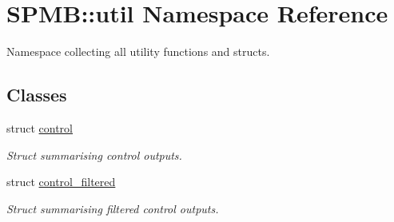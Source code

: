 \hypertarget{namespaceSPMB_1_1util}{}\section{S\+P\+MB\+:\+:util Namespace Reference}
\label{namespaceSPMB_1_1util}


Namespace collecting all utility functions and structs.  


\subsection*{Classes}
\begin{DoxyCompactItemize}
\item 
struct \hyperlink{structSPMB_1_1util_1_1control}{control}
\begin{DoxyCompactList}\small\item\em Struct summarising control outputs. \end{DoxyCompactList}\item 
struct \hyperlink{structSPMB_1_1util_1_1control__filtered}{control\+\_\+filtered}
\begin{DoxyCompactList}\small\item\em Struct summarising filtered control outputs. \end{DoxyCompactList}\end{DoxyCompactItemize}
